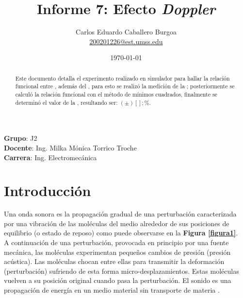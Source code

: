 \documentclass[letter,11pt]{article}
\title{Informe 7: Efecto \emph{Doppler}}
\author{Carlos Eduardo Caballero Burgoa \\
    \small{\href{mailto:200201226@est.umss.edu}{200201226@est.umss.edu}}
}
\date{\today}
\newcommand{\source}[1]{\vspace{-11pt} \caption*{\small{\textbf{Nota:} {#1}}}}
\begin{document}
\maketitle
\begin{center}
    \textbf{Grupo}: J2\\
    \textbf{Docente}: Ing. Milka Mónica Torrico Troche\\
    \textbf{Carrera}: Ing. Electromecánica
\end{center}

\begin{abstract}
Este documento detalla el experimento realizado en simulador para hallar la
relación funcional entre ,
además del , para esto se realizó la medición de la
; posteriormente se
calculó la relación funcional con el método de mínimos cuadrados, finalmente se
determinó el valor de la , resultando ser:
$( \pm )[]; \%$.
\end{abstract}

\section{Introducción}


Una onda sonora es la propagación gradual de una perturbación caracterizada por
una vibración de las moléculas del medio alrededor de sus posiciones de
equilibrio (o estado de reposo) como puede observarse en la
\textbf{Figura \ref{figura1}}.
\\

A continuación de una perturbación, provocada en principio por una fuente
mecánica, las moléculas experimentan pequeños cambios de presión (presión
acústica). Las moléculas chocan entre ellas para transmitir la deformación
(perturbación) sufriendo de esta forma micro-desplazamientos. Estas moléculas
vuelven a su posición original cuando pasa la perturbación. El sonido es una
propagación de energía en un medio material sin transporte de materia
\cite{COCHLEA}.
\\

\end{document}
